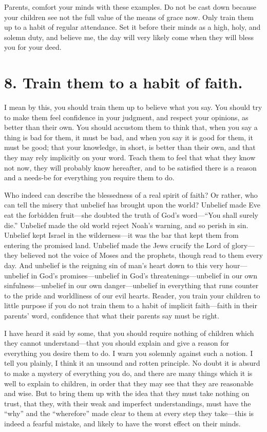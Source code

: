 \documentclass[
]{book}
\begin{document}
Parents, comfort your minds with these examples. Do not be cast down because your children see not the full value of the means of grace now. Only train them up to a habit of regular attendance. Set it before their minds as a high, holy, and solemn duty, and believe me, the day will very likely come when they will bless you for your deed.

\hypertarget{train-them-to-a-habit-of-faith.}{%
\section*{8. Train them to a habit of faith.}\label{train-them-to-a-habit-of-faith.}}

I mean by this, you should train them up to believe what you say. You should try to make them feel confidence in your judgment, and respect your opinions, as better than their own. You should accustom them to think that, when you say a thing is bad for them, it must be bad, and when you say it is good for them, it must be good; that your knowledge, in short, is better than their own, and that they may rely implicitly on your word. Teach them to feel that what they know not now, they will probably know hereafter, and to be satisfied there is a reason and a needs-be for everything you require them to do.

Who indeed can describe the blessedness of a real spirit of faith? Or rather, who can tell the misery that unbelief has brought upon the world? Unbelief made Eve eat the forbidden fruit---she doubted the truth of God's word---``You shall surely die.'' Unbelief made the old world reject Noah's warning, and so perish in sin. Unbelief kept Israel in the wilderness---it was the bar that kept them from entering the promised land. Unbelief made the Jews crucify the Lord of glory---they believed not the voice of Moses and the prophets, though read to them every day. And unbelief is the reigning sin of man's heart down to this very hour---unbelief in God's promises---unbelief in God's threatenings---unbelief in our own sinfulness---unbelief in our own danger---unbelief in everything that runs counter to the pride and worldliness of our evil hearts. Reader, you train your children to little purpose if you do not train them to a habit of implicit faith---faith in their parents' word, confidence that what their parents say must be right.

I have heard it said by some, that you should require nothing of children which they cannot understand---that you should explain and give a reason for everything you desire them to do. I warn you solemnly against such a notion. I tell you plainly, I think it an unsound and rotten principle. No doubt it is absurd to make a mystery of everything you do, and there are many things which it is well to explain to children, in order that they may see that they are reasonable and wise. But to bring them up with the idea that they must take nothing on trust, that they, with their weak and imperfect understandings, must have the ``why'' and the ``wherefore'' made clear to them at every step they take---this is indeed a fearful mistake, and likely to have the worst effect on their minds.
\end{document}
